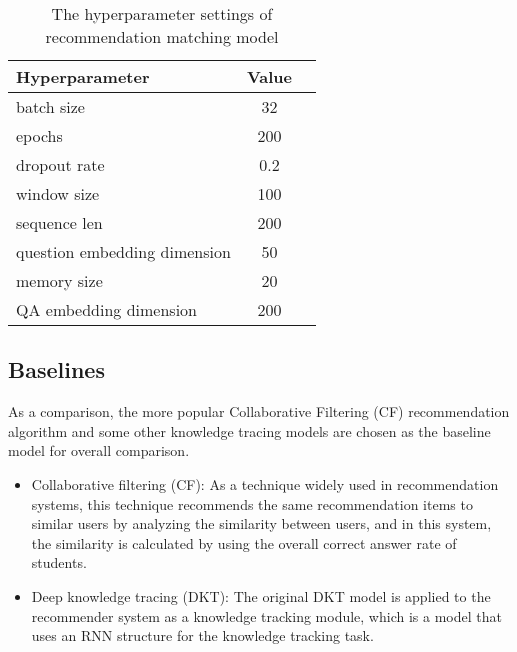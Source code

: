 \begin{table}[htb]
    \caption{The hyperparameter settings of recommendation matching model}\label{tbl:ch4-hpsetting}
    \centering
    \begin{tabular}{l c c}
        \toprule
        Hyperparameter               & Value \\
        \midrule
        batch size                   & 32    \\
        epochs                       & 200   \\
        dropout rate                 & 0.2   \\
        window size                  & 100   \\
        sequence len                 & 200   \\
        question embedding dimension & 50    \\
        memory size                  & 20    \\
        QA embedding dimension       & 200   \\
        \bottomrule
    \end{tabular}
\end{table}

\subsection{Baselines}

As a comparison, the more popular Collaborative Filtering (CF) recommendation algorithm and some other knowledge tracing models are chosen as the baseline model for overall comparison.
\begin{itemize}
    \item Collaborative filtering (CF): As a technique widely used in recommendation systems, this technique recommends the same recommendation items to similar users by analyzing the similarity between users, and in this system, the similarity is calculated by using the overall correct answer rate of students.
    \item Deep knowledge tracing (DKT): The original DKT model is applied to the recommender system as a knowledge tracking module, which is a model that uses an RNN structure for the knowledge tracking task.
\end{itemize}



